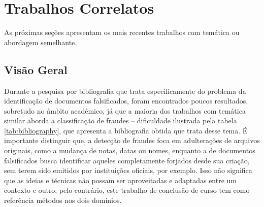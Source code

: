 \chapter{Trabalhos Correlatos}

As próximas seções apresentam os mais recentes trabalhos com temática ou abordagem semelhante.

\section{Visão Geral}

Durante a pesquisa por bibliografia que trata especificamente do problema da identificação de documentos falsificados, foram encontrados poucos resultados, sobretudo no âmbito acadêmico, já que a maioria dos trabalhos com temática similar aborda a classificação de fraudes -- dificuldade ilustrada pela tabela \ref{tab:bibliography}, que apresenta a bibliografia obtida que trata desse tema. É importante distinguir que, a detecção de fraudes foca em adulterações de arquivos originais, como a mudança de notas, datas ou nomes, enquanto a de documentos falsificados busca identificar aqueles completamente forjados desde sua criação, sem terem sido emitidos por instituições oficiais, por exemplo. Isso não significa que as ideias e técnicas não possam ser aproveitadas e adaptadas entre um contexto e outro, pelo contrário, este trabalho de conclusão de curso tem como referência métodos nos dois domínios.

\begin{table}[H]
    \caption{Bibliografia Pesquisada com Temas Abordados}
    \label{tab:bibliography}
\end{table}

